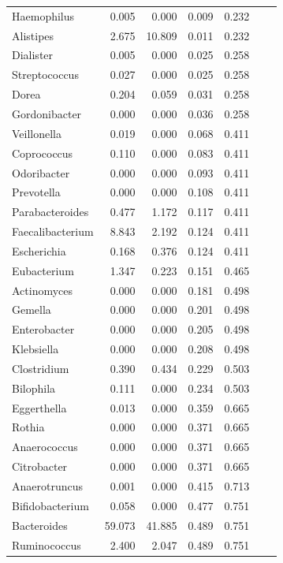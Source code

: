 {\begin{longtable}{ | l | r | r | r | r | r | r  | }
	
		   Haemophilus & 0.005 & 0.000 & 0.009 & 0.232 \\ 
		   Alistipes & 2.675 & 10.809 & 0.011 & 0.232 \\ 
		   Dialister & 0.005 & 0.000 & 0.025 & 0.258 \\ 
		   Streptococcus & 0.027 & 0.000 & 0.025 & 0.258 \\ 
		   Dorea & 0.204 & 0.059 & 0.031 & 0.258 \\ 
		   Gordonibacter & 0.000 & 0.000 & 0.036 & 0.258 \\ 
		   Veillonella & 0.019 & 0.000 & 0.068 & 0.411 \\ 
		   Coprococcus & 0.110 & 0.000 & 0.083 & 0.411 \\ 
		   Odoribacter & 0.000 & 0.000 & 0.093 & 0.411 \\ 
		   Prevotella & 0.000 & 0.000 & 0.108 & 0.411 \\ 
		   Parabacteroides & 0.477 & 1.172 & 0.117 & 0.411 \\ 
		   Faecalibacterium & 8.843 & 2.192 & 0.124 & 0.411 \\ 
		   Escherichia & 0.168 & 0.376 & 0.124 & 0.411 \\ 
		   Eubacterium & 1.347 & 0.223 & 0.151 & 0.465 \\ 
		   Actinomyces & 0.000 & 0.000 & 0.181 & 0.498 \\ 
		   Gemella & 0.000 & 0.000 & 0.201 & 0.498 \\ 
		   Enterobacter & 0.000 & 0.000 & 0.205 & 0.498 \\ 
		   Klebsiella & 0.000 & 0.000 & 0.208 & 0.498 \\ 
		   Clostridium & 0.390 & 0.434 & 0.229 & 0.503 \\ 
		   Bilophila & 0.111 & 0.000 & 0.234 & 0.503 \\ 
		   Eggerthella & 0.013 & 0.000 & 0.359 & 0.665 \\ 
		   Rothia & 0.000 & 0.000 & 0.371 & 0.665 \\ 
		   Anaerococcus & 0.000 & 0.000 & 0.371 & 0.665 \\ 
		   Citrobacter & 0.000 & 0.000 & 0.371 & 0.665 \\ 
		   Anaerotruncus & 0.001 & 0.000 & 0.415 & 0.713 \\ 
		   Bifidobacterium & 0.058 & 0.000 & 0.477 & 0.751 \\ 
		   Bacteroides & 59.073 & 41.885 & 0.489 & 0.751 \\ 
		   Ruminococcus & 2.400 & 2.047 & 0.489 & 0.751 \\ 

\end{longtable}}
